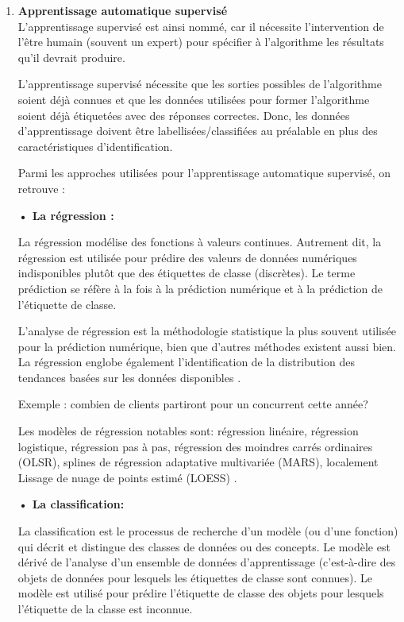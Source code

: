 \begin{enumerate}[leftmargin=0.5cm]
\item \textbf{Apprentissage automatique supervisé}\\
L'apprentissage supervisé est ainsi nommé, car il nécessite l'intervention de l'être humain (souvent un expert) pour spécifier à l'algorithme les résultats qu'il devrait produire.

L'apprentissage supervisé nécessite que les sorties possibles de l'algorithme soient déjà connues et que les données utilisées pour former l'algorithme soient déjà étiquetées avec des réponses correctes. Donc, les données d'apprentissage doivent être labellisées/classifiées au préalable en plus des caractéristiques d'identification.

Parmi les approches utilisées pour l'apprentissage automatique supervisé, on retrouve :

\textbf{• La régression :} 

La régression modélise des fonctions à valeurs continues. Autrement dit, la régression est utilisée pour prédire des valeurs de données numériques indisponibles plutôt que des étiquettes de classe (discrètes). Le terme prédiction se réfère à la fois à la prédiction numérique et à la prédiction de l'étiquette de classe.

L'analyse de régression est la méthodologie statistique la plus souvent utilisée pour la prédiction numérique, bien que d'autres méthodes existent aussi bien. La régression englobe également l'identification de la distribution des tendances basées sur les données disponibles \cite{Han}.

Exemple : combien de clients partiront pour un concurrent cette année? 

Les modèles de régression notables sont: régression linéaire, régression logistique, régression pas à pas, régression des moindres carrés ordinaires (OLSR), splines de régression adaptative multivariée (MARS), localement Lissage de nuage de points estimé (LOESS) \cite{surveymachinelearningregression}.

\textbf{• La classification:}

La classification est le processus de recherche d'un modèle (ou d'une fonction) qui décrit et distingue des classes de données ou des concepts. Le modèle est dérivé de l'analyse d'un ensemble de données d'apprentissage (c'est-à-dire des objets de données pour lesquels les étiquettes de classe sont connues). Le modèle est utilisé pour prédire l'étiquette de classe des objets pour lesquels l'étiquette de la classe est inconnue.


\end{enumerate}

